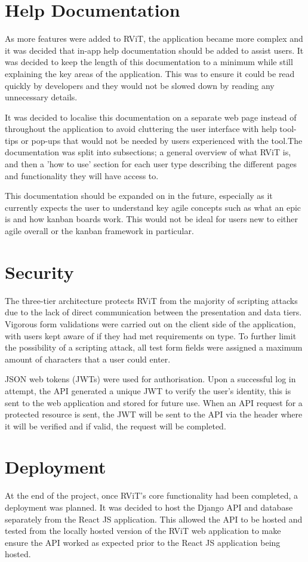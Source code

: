 \documentclass[l4proj.tex]{subfiles}
\begin{document}
\section{Help Documentation}
As more features were added to RViT, the application became more complex and it was decided that in-app help documentation should be added to assist users. It was decided to keep the length of this documentation to a minimum while still explaining the key areas of the application. This was to ensure it could be read quickly by developers and they would not be slowed down by reading any unnecessary details. 

It was decided to localise this documentation on a separate web page instead of throughout the application to avoid cluttering the user interface with help tool-tips or pop-ups that would not be needed by users experienced with the tool.The documentation was split into subsections; a general overview of what RViT is, and then a 'how to use' section for each user type describing the different pages and functionality they will have access to.

This documentation should be expanded on in the future, especially as it currently expects the user to understand key agile concepts such as what an epic is and how kanban boards work. This would not be ideal for users new to either agile overall or the kanban framework in particular. 

\section{Security}
The three-tier architecture protects RViT from the majority of scripting attacks due to the lack of direct communication between the presentation and data tiers. Vigorous form validations were carried out on the client side of the application, with users kept aware of if they had met requirements on type. To further limit the possibility of a scripting attack, all test form fields were assigned a maximum amount of characters that a user could enter.

JSON web tokens (JWTs) were used for authorisation. Upon a successful log in attempt, the API generated a unique JWT to verify the user's identity, this is sent to the web application and stored for future use. When an API request for a protected resource is sent, the JWT will be sent to the API via the header where it will be verified and if valid, the request will be completed.  

\section{Deployment}
At the end of the project, once RViT's core functionality had been completed, a deployment was planned. It was decided to host the Django API and database separately from the React JS application. This allowed the API to be hosted and tested from the locally hosted version of the RViT web application to make ensure the API worked as expected prior to the React JS application being hosted.
\end{document}
